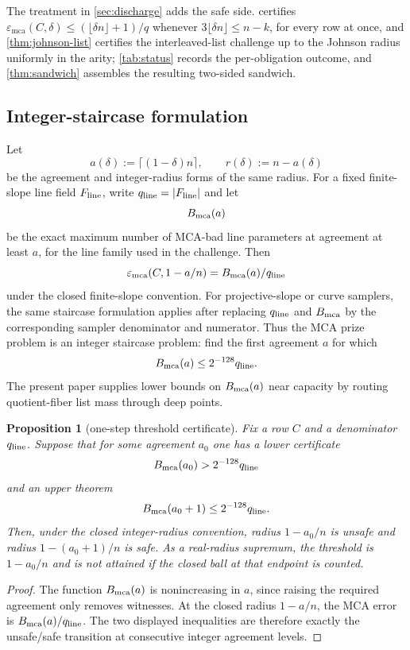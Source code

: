 \documentclass[11pt]{article}
\newtheorem{proposition}[theorem]{Proposition}
\theoremstyle{definition}
\theoremstyle{remark}
\newcommand{\emca}{\varepsilon_{\mathrm{mca}}}
\begin{document}
The treatment in \cref{sec:discharge} adds the safe side.  certifies $\emca(C,\delta)\le(\lfloor\delta n\rfloor+1)/q$ whenever $3\lfloor\delta n\rfloor\le n-k$, for every row at once, and \cref{thm:johnson-list} certifies the interleaved-list challenge up to the Johnson radius uniformly in the arity; \cref{tab:status} records the per-obligation outcome, and \cref{thm:sandwich} assembles the resulting two-sided sandwich.

\subsection{Integer-staircase formulation}

Let
\[
        a(\delta):=\lceil(1-\delta)n\rceil,
        \qquad r(\delta):=n-a(\delta)
\]
be the agreement and integer-radius forms of the same radius.  For a fixed finite-slope line
field $F_{\rm line}$, write $q_{\rm line}=|F_{\rm line}|$ and let
\[
        B_{\rm mca}(a)
\]
be the exact maximum number of MCA-bad line parameters at agreement at least
$a$, for the line family used in the challenge.  Then
\[
        \emca(C,1-a/n)=B_{\rm mca}(a)/q_{\rm line}
\]
under the closed finite-slope convention.  For projective-slope or curve samplers, the same staircase formulation applies after replacing $q_{\rm line}$ and $B_{\rm mca}$ by the corresponding sampler denominator and numerator.  Thus the MCA prize problem is an
integer staircase problem: find the first agreement $a$ for which
\[
        B_{\rm mca}(a)\le 2^{-128}q_{\rm line}.
\]
The present paper supplies lower bounds on $B_{\rm mca}(a)$ near capacity by
routing quotient-fiber list mass through deep points.

\begin{proposition}[one-step threshold certificate]\label{prop:onestep}
Fix a row $C$ and a denominator $q_{\rm line}$.  Suppose that for some agreement
$a_0$ one has a lower certificate
\[
        B_{\rm mca}(a_0)>2^{-128}q_{\rm line}
\]
and an upper theorem
\[
        B_{\rm mca}(a_0+1)\le2^{-128}q_{\rm line}.
\]
Then, under the closed integer-radius convention, radius $1-a_0/n$ is unsafe and
radius $1-(a_0+1)/n$ is safe.  As a real-radius supremum, the threshold is
$1-a_0/n$ and is not attained if the closed ball at that endpoint is counted.
\end{proposition}

\begin{proof}
The function $B_{\rm mca}(a)$ is nonincreasing in $a$, since raising the
required agreement only removes witnesses.  At the closed radius $1-a/n$, the
MCA error is $B_{\rm mca}(a)/q_{\rm line}$.  The two displayed inequalities are
therefore exactly the unsafe/safe transition at consecutive integer agreement
levels.
\end{proof}
\end{document}
